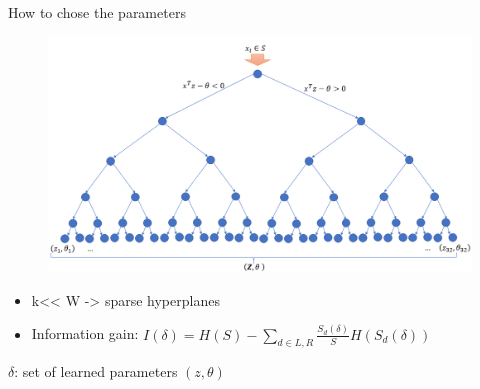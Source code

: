
\begin {frame}{How to chose the parameters}
\begin {figure}
\includegraphics[scale=0.35]{pictures/tree}
\end {figure}

\begin{itemize}
\item k<< W -> sparse hyperplanes
\item Information gain: $I(\delta) = H(S) -\sum_{d\in L,R}  H(S_{d}(\delta))$
\end{itemize}
$\delta$: set of learned parameters $(z,\theta)$
\end{frame}

